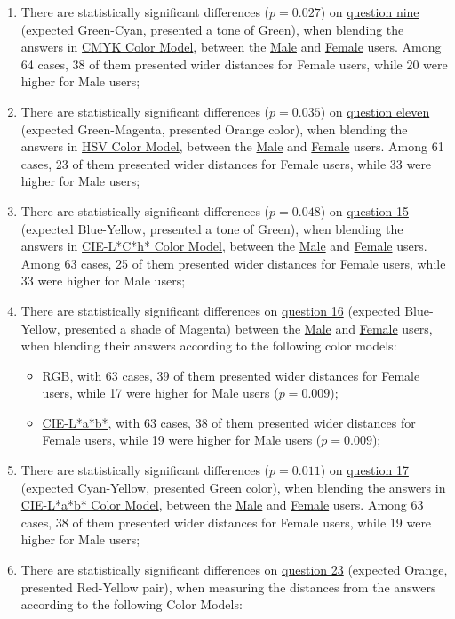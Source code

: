 \begin{enumerate}
  \setlength\itemsep{0.01em}
  \item There are statistically significant differences ($p = 0.027$) on \ul{question nine} (expected Green-Cyan, presented a tone of Green), when blending the answers in \ul{CMYK Color Model}, between the \ul{Male} and \ul{Female} users. Among 64 cases, 38 of them presented wider distances for
  Female users, while 20 were higher for Male users;
  \item There are statistically significant differences ($p = 0.035$) on \ul{question eleven} (expected Green-Magenta, presented Orange color), when blending the answers in \ul{HSV Color Model}, between the \ul{Male} and \ul{Female} users. Among 61 cases, 23 of them presented wider distances for
  Female users, while 33 were higher for Male users;
  \item There are statistically significant differences ($p = 0.048$) on \ul{question 15} (expected Blue-Yellow, presented a tone of Green), when blending the answers in \ul{CIE-L*C*h* Color Model}, between the \ul{Male} and \ul{Female} users. Among 63 cases, 25 of them presented wider distances for
  Female users, while 33 were higher for Male users;
  \item There are statistically significant differences on \ul{question 16} (expected Blue-Yellow, presented a shade of Magenta) between the \ul{Male} and \ul{Female} users, when blending their answers according to the following color models:
    \begin{itemize}
      \item \ul{RGB}, with 63 cases, 39 of them presented wider distances for Female users, while 17 were higher for Male users ($p = 0.009$);
      \item \ul{CIE-L*a*b*}, with 63 cases, 38 of them presented wider distances for Female users, while 19 were higher for Male users ($p = 0.009$);
    \end{itemize}
  \item There are statistically significant differences ($p = 0.011$) on \ul{question 17} (expected Cyan-Yellow, presented Green color), when blending the answers in \ul{CIE-L*a*b* Color Model}, between the \ul{Male} and \ul{Female} users. Among 63 cases, 38 of them presented wider distances for
  Female users, while 19 were higher for Male users;
  \item There are statistically significant differences on \ul{question 23} (expected Orange, presented Red-Yellow pair), when measuring the distances from the answers according to the following Color Models:

\end{enumerate}
